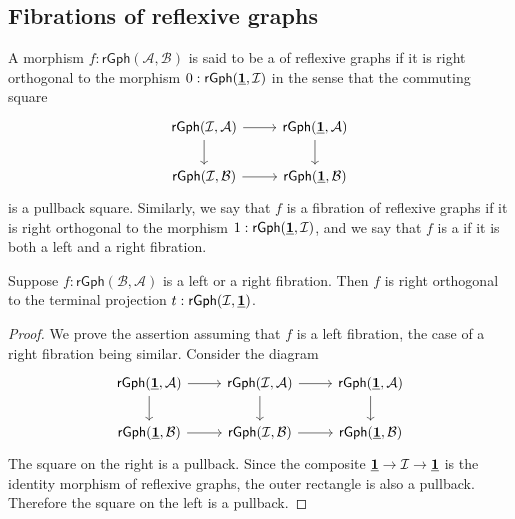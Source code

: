 \subsection{Fibrations of reflexive graphs}

\begin{defn}
A morphism $f:\mathsf{rGph}(\mathcal{A},\mathcal{B})$ is said to be a  of reflexive graphs if it is right orthogonal to the morphism $0:\mathsf{rGph}(\underline{\mathbf{1}},\mathcal{I})$ in the sense that the commuting square
\begin{equation*}
\begin{tikzcd}
\mathsf{rGph}(\mathcal{I},\mathcal{A}) \arrow[r] \arrow[d] & \mathsf{rGph}(\unit,\mathcal{A}) \arrow[d] \\
\mathsf{rGph}(\mathcal{I},\mathcal{B}) \arrow[r] & \mathsf{rGph}(\unit,\mathcal{B})
\end{tikzcd}
\end{equation*}
is a pullback square. Similarly, we say that $f$ is a  fibration of reflexive graphs if it is right orthogonal to the morphism $1:\mathsf{rGph}(\underline{\mathbf{1}},\mathcal{I})$, and we say that $f$ is a  if it is both a left and a right fibration.
\end{defn}

\begin{lem}\label{lem:leftfib_Inull}
Suppose $f:\mathsf{rGph}(\mathcal{B},\mathcal{A})$ is a left or a right fibration. Then $f$ is right orthogonal to the terminal projection $t:\mathsf{rGph}(\mathcal{I},\underline{\mathbf{1}})$.
\end{lem}

\begin{proof}
We prove the assertion assuming that $f$ is a left fibration, the case of a right fibration being similar. Consider the diagram
\begin{equation*}
\begin{tikzcd}
\mathsf{rGph}(\unit,\mathcal{A}) \arrow[d] \arrow[r] & \mathsf{rGph}(\mathcal{I},\mathcal{A}) \arrow[r] \arrow[d] & \mathsf{rGph}(\unit,\mathcal{A}) \arrow[d] \\
\mathsf{rGph}(\unit,\mathcal{B}) \arrow[r] & \mathsf{rGph}(\mathcal{I},\mathcal{B}) \arrow[r] & \mathsf{rGph}(\unit,\mathcal{B})
\end{tikzcd}
\end{equation*}
The square on the right is a pullback. Since the composite $\underline{\mathbf{1}} \to \mathcal{I}\to \underline{\mathbf{1}}$ is the identity morphism of reflexive graphs, the outer rectangle is also a pullback. Therefore the square on the left is a pullback.
\end{proof}

